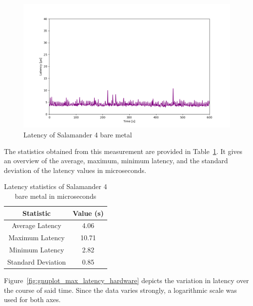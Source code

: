 \documentclass[MMR,Master,english]{twbook}
\begin{document}
\begin{figure}[H]
	\centering
	\includegraphics[width=1.0\columnwidth]{img/max_latency_hardware.png}
	\caption[Latency of Salamander 4 bare metal]{Latency of Salamander 4 bare metal}
	\label{fig:max_latency_hardware}
\end{figure}

\noindent The statistics obtained from this measurement are provided in Table~\ref{tab:latency_statistics_bare_metal}. It gives an overview of the average, maximum, minimum latency, and the standard deviation of the latency values in microseconds. 


\begin{table}[H]
	\centering
	\caption{Latency statistics of Salamander 4 bare metal in microseconds}
	\label{tab:latency_statistics_bare_metal}
	\setlength{\tabcolsep}{0.5em} %
	{\renewcommand{\arraystretch}{1.2}%
	\begin{tabular}{|c|c|}\hline
	\textbf{Statistic} & \textbf{Value (\textmu s)} \\\hline
	Average Latency & 4.06 \\\hline
	Maximum Latency & 10.71 \\\hline
	Minimum Latency & 2.82 \\\hline
	Standard Deviation & 0.85 \\\hline
	\end{tabular}}
	\end{table}

\noindent Figure~\ref{fig:gnuplot_max_latency_hardware} depicts the variation in latency over the course of said time. Since the data varies strongly, a logarithmic scale was used for both axes.
\end{document}
